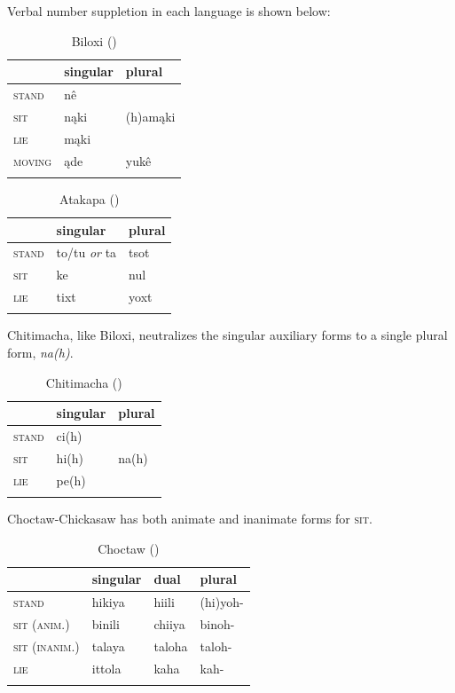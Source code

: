 \documentclass[output=paper]{LSP/langsci}
\begin{document}
	Verbal number suppletion in each language is shown below:

\begin{table}
\caption{Biloxi (\citealt[3]{DorseySwanton1912})}
\begin{tabularx}{.5\textwidth}{XXX}
\lsptoprule
& singular & plural \\
\midrule
\textsc{stand} & nê & \\
\textsc{sit} & nąki & (h)amąki \\
 \textsc{lie} & mąki & \\ 
 \textsc{moving} & ąde & yukê \\
 \lspbottomrule
\end{tabularx}
\end{table}

\begin{table}
\caption{Atakapa (\citealt[3]{GatschetSwanton1932})}
\begin{tabularx}{.5\textwidth}{XXX }
\lsptoprule
& singular & plural \\
\midrule
\textsc{stand} & to/tu \emph{or} ta & tsot \\
\textsc{sit} & ke & nul \\
\textsc{lie} & tixt & yoxt \\
\lspbottomrule
\end{tabularx} 
\end{table}

Chitimacha, like Biloxi, neutralizes the singular auxiliary forms to a single plural form, \emph{na(h)}.

\begin{table}
\caption{Chitimacha (\citealt[32]{Swadesh1939})}
\begin{tabularx}{.5\textwidth}{ XXX}
\lsptoprule
& singular & plural \\
\midrule
\textsc{stand} & ci(h) &  \\
\textsc{sit} & hi(h) & na(h) \\
 \textsc{lie} & pe(h) &  \\
\lspbottomrule
\end{tabularx}
\end{table}

Choctaw-Chickasaw has both animate and inanimate forms for \textsc{sit}.

\begin{table}
\caption{Choctaw (\citealt[3]{Broadwell2006})}
\begin{tabularx}{.75\textwidth}{lXXX}
\lsptoprule
 & singular & dual & plural \\
\midrule
\textsc{stand} & hikiya\footnotemark & hiili & (hi)yoh- \\
\textsc{sit (anim.)} & binili & chiiya & binoh- \\
\textsc{sit (inanim.)} & talaya & taloha & taloh- \\
 \textsc{lie} & ittola & kaha & kah- \\
\lspbottomrule
\end{tabularx} 
\end{table}
\end{document}
